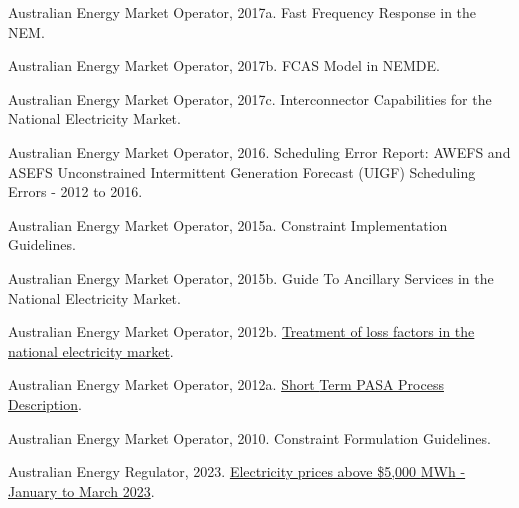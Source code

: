 \documentclass[12pt,a4paper,]{report}
\newlength{\cslhangindent}
\newenvironment{CSLReferences}[2] %
 {%
  \setlength{\parindent}{0pt}
  \ifodd #1 \everypar{\setlength{\hangindent}{\cslhangindent}}\ignorespaces\fi
  \ifnum #2 > 0
  \setlength{\parskip}{#2\baselineskip}
  \fi
 }%
 {}
\begin{document}
\begin{CSLReferences}{1}{0}
\leavevmode{}%
Australian Energy Market Operator, 2017a. Fast {Frequency Response} in
the {NEM}.

\leavevmode{}%
Australian Energy Market Operator, 2017b. {FCAS Model} in {NEMDE}.

\leavevmode{}%
Australian Energy Market Operator, 2017c. Interconnector {Capabilities}
for the {National Electricity Market}.

\leavevmode{}%
Australian Energy Market Operator, 2016. Scheduling {Error Report}:
{AWEFS} and {ASEFS Unconstrained Intermittent Generation Forecast}
({UIGF}) {Scheduling Errors} - 2012 to 2016.

\leavevmode{}%
Australian Energy Market Operator, 2015a. Constraint {Implementation
Guidelines}.

\leavevmode{}%
Australian Energy Market Operator, 2015b. Guide {To Ancillary Services}
in the {National Electricity Market}.

\leavevmode{}%
Australian Energy Market Operator, 2012b.
\href{https://www.aemo.com.au/Electricity/National-Electricity-Market-NEM/Security-and-reliability/-/media/93BB87A6E1F141DBB7B0D02AFD902D4F.ashx}{Treatment
of loss factors in the national electricity market}.

\leavevmode{}%
Australian Energy Market Operator, 2012a.
\href{https://www.aemo.com.au/-/media/files/electricity/nem/planning_and_forecasting/pasa/stpasa-process-description.pdf}{Short
{Term PASA Process Description}}.

\leavevmode{}%
Australian Energy Market Operator, 2010. Constraint {Formulation
Guidelines}.

\leavevmode{}%
Australian Energy Regulator, 2023.
\href{https://www.aer.gov.au/system/files/AER\%20-\%20Electricity\%20prices\%20above\%20\%245\%2C000\%20MWh\%20-\%20January\%20to\%20March\%202023_1.pdf}{Electricity
prices above \$5,000 {MWh} - {January} to {March} 2023}.


\end{CSLReferences}
\end{document}
